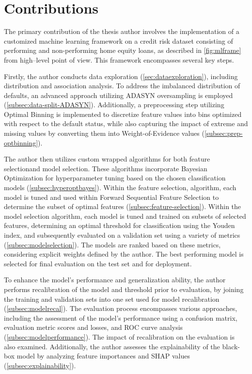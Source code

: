 \section{Contributions}
\label{sec:contributions}
The primary contribution of the thesis author involves the implementation of a customized machine learning framework on a credit risk dataset consisting of performing and non-performing home equity loans, as described in \autoref{fig:mlframe} from high--level point of view. This framework encompasses several key steps.

Firstly, the author conducts data exploration (\autoref{sec:dataexploration}), including distribution and association analysis. To address the imbalanced distribution of defaults, an advanced approach utilizing ADASYN oversampling is employed (\autoref{subsec:data-split-ADASYN}).
Additionally, a preprocessing step utilizing Optimal Binning is implemented to discretize feature values into bins optimized with respect to the default status, while also capturing the impact of extreme and missing values by converting them into Weight-of-Evidence values (\autoref{subsec:prep-optbinning}).

The author then utilizes custom wrapped algorithms for both feature selectionand model selection.
These algorithms incorporate Bayesian Optimization for hyperparameter tuning based on the chosen classification models (\autoref{subsec:hyperoptbayes}).
Within the feature selection, algorithm, each model is tuned and used within Forward Sequential Feature Selection to determine the subset of optimal features  (\autoref{subsec:feature-selection}).
Within the model selection algorithm, each model is tuned and trained on subsets of selected features, determining an optimal threshold for classification using the Youden index, and subsequently evaluated on a validation set using a variety of metrics (\autoref{subsec:modelselection}).
The models are ranked based on these metrics, considering explicit weights defined by the author.
The best performing model is selected for final evaluation on the test set and for deployment.

To enhance the model's performance and generalization ability, the author performs recalibration of the model and threshold prior to evaluation, by joining the training and validation sets into one set used for model recalibration (\autoref{subsec:modelrecal}).
The evaluation process encompasses various approaches, including the assessment of the model's performance using a confusion matrix, evaluation metric scores and losses, and ROC curve analysis (\autoref{subsec:modelperformance}).
The impact of recalibration on the evaluation is also examined.
Additionally, the author assesses the explainability of the black-box model by analyzing feature importances and SHAP values (\autoref{subsec:explainability}).


